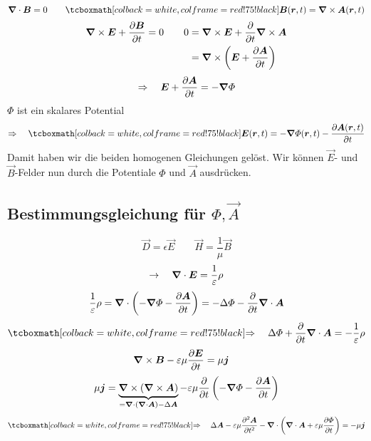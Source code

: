 \begin{equation*}
\vabla \cdot \vec{B} = 0 \qquad \rmbox{\vec{B}(\vec{r},t) = \vabla \times \vec{A}(\vec{r},t)}
\end{equation*}
\begin{align*}
\bm{\nabla} \times \bm{E} + \frac{\partial \bm{B}}{\partial t} = 0 \qquad 0 &= \bm{\nabla} \times \bm{E} + \frac{\partial }{\partial t} \bm{\nabla} \times \bm{A} \\
&= \bm{\nabla} \times \left(\bm{E} + \frac{\partial \bm{A}}{\partial t}\right)
\end{align*}
\begin{equation*}
\Rightarrow \quad \bm{E} + \frac{\partial \bm{A}}{\partial t} = - \bm{\nabla} \varPhi
\end{equation*}
$ \Phi $ ist ein skalares Potential
\begin{equation*}
\Rightarrow \quad \rmbox{\vec{E}(\vec{r},t) = - \vabla \Phi(\vec{r},t) - \prt{\vec{A}(\vec{r},t)}{t}}
\end{equation*}
Damit haben wir die beiden homogenen Gleichungen gelöst. Wir können $ \vec{E} $- und $ \vec{B} $-Felder nun durch die Potentiale $ \Phi $ und $ \vec{A} $ ausdrücken.

\subsection{Bestimmungsgleichung für \texorpdfstring{$ \Phi , \vec{A} $}{phi A}}

\begin{equation*}
\vec{D} = \epsilon \vec{E} \qquad \vec{H} = \frac{1}{\mu} \vec{B}
\end{equation*}
\begin{align*}
\rightarrow \quad \bm{\nabla} \cdot \bm{E} = \frac{1}{\varepsilon} \rho
\end{align*}
\begin{equation*}
\frac{1}{\varepsilon} \rho = \bm{\nabla} \cdot \left(- \bm{\nabla} \varPhi - \frac{\partial \bm{A}}{\partial t}\right) = - \Delta \varPhi - \frac{\partial }{\partial t} \bm{\nabla} \cdot \bm{A}
\end{equation*}
\begin{equation*}
\rmbox{\Rightarrow \quad \Delta \Phi + \prt{}{t} \vabla \cdot \vec{A} = - \frac{1}{\epsilon} \rho}
\end{equation*}
\begin{align*}
& \bm{\nabla} \times \bm{B} - \varepsilon \mu \frac{\partial \bm{E}}{\partial t} = \mu \bm{j}
\end{align*}
\begin{equation*}
\mu \bm{j} = \underbrace{\bm{\nabla} \times (\bm{\nabla} \times \bm{A})}_{=\bm{\nabla} \cdot (\bm{\nabla} \cdot \bm{A}) - \Delta \bm{A}} - \varepsilon \mu \frac{\partial }{\partial t} \left(- \bm{\nabla} \varPhi - \frac{\partial \bm{A}}{\partial t}\right)
\end{equation*}
\begin{equation*}
\rmbox{\Rightarrow \quad \Delta \vec{A} - \epsilon \mu \prt{^2 \vec{A}}{t^2} - \vabla \cdot \left(\vabla \cdot \vec{A} + \epsilon \mu \prt{\Phi}{t}\right) = - \mu \vec{j}}
\end{equation*}

